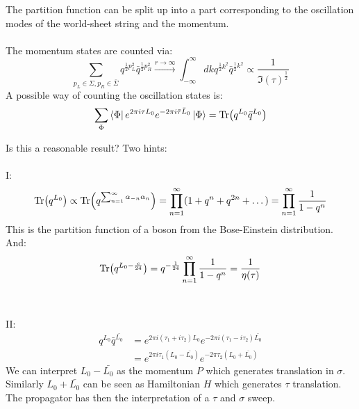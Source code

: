 \documentclass[11pt,aspectratio=169]{beamer}
\begin{document}
\begin{frame}
	The partition function can be split up into a part corresponding to the oscillation modes of the world-sheet string and the momentum.
	\\~\\
	The momentum states are counted via:
	\begin{equation}
		\sum_{p_L\in\Sigma, p_R\in\bar{\Sigma}} q^{\frac{1}{2}p_L^2}\bar{q}^{\frac{1}{2}p_R^2}  \xrightarrow{\text{$r \rightarrow \infty$}} \int_{-\infty}^{\infty}dk q^{\frac{1}{2}k^2}\bar{q}^{\frac{1}{2}k^2} \propto \frac{1}{\Im(\tau)^{\frac{1}{2}}}
	\end{equation}	
	A possible way of counting the oscillation states is:
	\begin{equation}
		\sum_{\Phi} \bra{\Phi} e^{2\pi i \tau L_0}e^{-2\pi i \bar{\tau} \bar{L}_0} \ket{\Phi} = \Tr(q^{L_0}\bar{q}^{L_0})
	\end{equation}
\end{frame}

\begin{frame}
	Is this a reasonable result? Two hints:
	\\~\\
	I:
	\begin{equation}
		\Tr(q^{L_0}) \propto \Tr(q^{\sum_{n=1}^{\infty}\alpha_{-n}\alpha_n}) = \prod_{n=1}^{\infty}(1 + q^n + q^{2n} + \dots) = \prod_{n=1}^{\infty}\frac{1}{1-q^n}	
	\end{equation}
	This is the partition function of a boson from the Bose-Einstein distribution.
	\\
	And:
	\begin{equation}
		\Tr(q^{L_0 - \frac{c}{24}}) = q^{-\frac{1}{24}} \prod_{n=1}^{\infty}\frac{1}{1-q^n}	= \frac{1}{\eta(\tau)}
	\end{equation}
	\\~\\
	II:
	\begin{align*}
		q^{L_0}\bar{q}^{\bar{L_0}} &= e^{2\pi i (\tau_1 + i \tau_2)L_0}e^{-2\pi i (\tau_1 - i \tau_2)\bar{L_0}}\\
		&= e^{2 \pi i \tau_1 (L_0 - \bar{L_0})}e^{-2\pi \tau_2 (L_0 + \bar{L_0})}
	\end{align*}
	We can interpret $L_0 - \bar{L_0}$ as the momentum $P$ which generates translation in $\sigma$. Similarly $L_0 + \bar{L_0}$ can be seen as Hamiltonian $H$ which generates $\tau$ translation.
	\\
	The propagator has then the interpretation of a $\tau$ and $\sigma$ sweep.

\end{frame}
\end{document}
